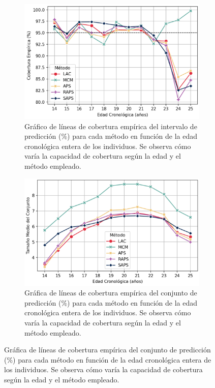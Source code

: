 \begin{figure}[htbp]
    \centering

    \begin{subfigure}[b]{0.9\textwidth}
        \centering
        \includegraphics[width=\textwidth]{capitulos/cap_05/imagenes/AGC_EC_by_true_age.png}
        \caption[
            Gráfica de líneas de cobertura empírica del conjunto de predicción (\%) para cada método en función de la edad cronológica entera de los individuos.
        ]{
            Gráfico de líneas de cobertura empírica del intervalo de predicción (\%) para cada método en función de la edad cronológica entera de los individuos. Se observa cómo varía la capacidad de cobertura según la edad y el método empleado.
        }
        \label{fig:AGC_EC_by_true_age}
    \end{subfigure}

    \vspace{0.5cm}
    
    \begin{subfigure}[b]{0.9\textwidth}
        \centering
        \includegraphics[width=\textwidth]{capitulos/cap_05/imagenes/AGC_MPSS_by_true_age.png}
        \caption[
            Gráfica de líneas de tamaño medio del conjunto de predicción para cada método en función de la edad cronológica entera de los individuos.
        ]{
            Gráfica de líneas de cobertura empírica del conjunto de predicción (\%) para cada método en función de la edad cronológica entera de los individuos. Se observa cómo varía la capacidad de cobertura según la edad y el método empleado.
        }
        \label{fig:AGC_MPSS_by_true_age}
    \end{subfigure}


\end{figure}
